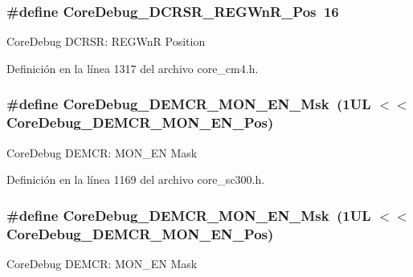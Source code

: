\subsubsection[{\texorpdfstring{Core\+Debug\+\_\+\+D\+C\+R\+S\+R\+\_\+\+R\+E\+G\+Wn\+R\+\_\+\+Pos}{CoreDebug_DCRSR_REGWnR_Pos}}]{\setlength{\rightskip}{0pt plus 5cm}\#define Core\+Debug\+\_\+\+D\+C\+R\+S\+R\+\_\+\+R\+E\+G\+Wn\+R\+\_\+\+Pos~16}\hypertarget{group___c_m_s_i_s___core_debug_ga51e75942fc0614bc9bb2c0e96fcdda9a}{}\label{group___c_m_s_i_s___core_debug_ga51e75942fc0614bc9bb2c0e96fcdda9a}
Core\+Debug D\+C\+R\+SR\+: R\+E\+G\+WnR Position 

Definición en la línea 1317 del archivo core\+\_\+cm4.\+h.

\subsubsection[{\texorpdfstring{Core\+Debug\+\_\+\+D\+E\+M\+C\+R\+\_\+\+M\+O\+N\+\_\+\+E\+N\+\_\+\+Msk}{CoreDebug_DEMCR_MON_EN_Msk}}]{\setlength{\rightskip}{0pt plus 5cm}\#define Core\+Debug\+\_\+\+D\+E\+M\+C\+R\+\_\+\+M\+O\+N\+\_\+\+E\+N\+\_\+\+Msk~(1\+U\+L $<$$<$ Core\+Debug\+\_\+\+D\+E\+M\+C\+R\+\_\+\+M\+O\+N\+\_\+\+E\+N\+\_\+\+Pos)}\hypertarget{group___c_m_s_i_s___core_debug_gac2b46b9b65bf8d23027f255fc9641977}{}\label{group___c_m_s_i_s___core_debug_gac2b46b9b65bf8d23027f255fc9641977}
Core\+Debug D\+E\+M\+CR\+: M\+O\+N\+\_\+\+EN Mask 

Definición en la línea 1169 del archivo core\+\_\+sc300.\+h.

\subsubsection[{\texorpdfstring{Core\+Debug\+\_\+\+D\+E\+M\+C\+R\+\_\+\+M\+O\+N\+\_\+\+E\+N\+\_\+\+Msk}{CoreDebug_DEMCR_MON_EN_Msk}}]{\setlength{\rightskip}{0pt plus 5cm}\#define Core\+Debug\+\_\+\+D\+E\+M\+C\+R\+\_\+\+M\+O\+N\+\_\+\+E\+N\+\_\+\+Msk~(1\+U\+L $<$$<$ Core\+Debug\+\_\+\+D\+E\+M\+C\+R\+\_\+\+M\+O\+N\+\_\+\+E\+N\+\_\+\+Pos)}\hypertarget{group___c_m_s_i_s___core_debug_gac2b46b9b65bf8d23027f255fc9641977}{}\label{group___c_m_s_i_s___core_debug_gac2b46b9b65bf8d23027f255fc9641977}
Core\+Debug D\+E\+M\+CR\+: M\+O\+N\+\_\+\+EN Mask 

